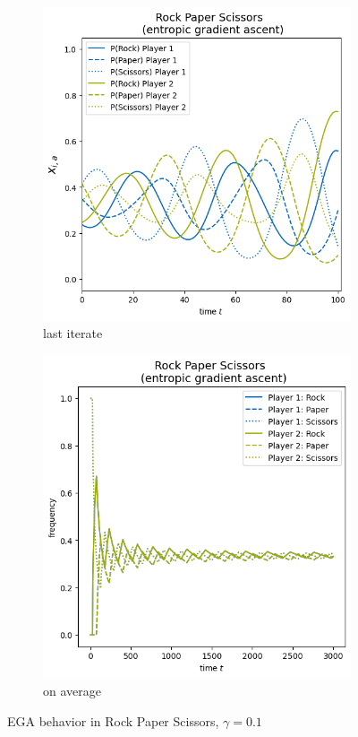 \begin{figure}[H]
\centering
\begin{subfigure}{.5\textwidth}
    \centering
    \includegraphics[width=\textwidth]{logos/RPS2.png}
    \caption{last iterate}
\end{subfigure}%
\begin{subfigure}{.5\textwidth}
    \centering
    \includegraphics[width=\textwidth]{logos/RPS3.png}
    \caption{on average}
\end{subfigure}
\caption{EGA behavior in Rock Paper Scissors, $\gamma = 0.1$}
\label{fig:RPS}
\end{figure}


